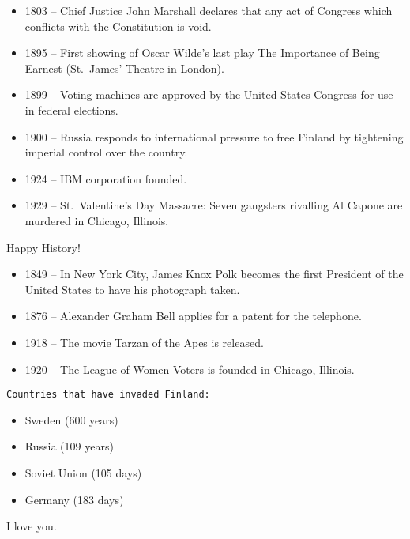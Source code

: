 \documentclass[12pt]{article}
\begin{document}
\vspace{-0.75 cm}
\begin{itemize}\setlength{\itemsep}{-0.12 cm}
\item 1803 -- Chief Justice John Marshall declares that any act of Congress which conflicts with the Constitution is void.
\item 1895 -- First showing of Oscar Wilde's last play The Importance of Being Earnest (St.\ James' Theatre in London).
\item 1899 -- Voting machines are approved by the United States Congress for use in federal elections.
\item 1900 -- Russia responds to international pressure to free Finland by tightening imperial control over the country.
\item 1924 -- IBM corporation founded.
\item 1929 -- St.\ Valentine's Day Massacre: Seven gangsters rivalling Al Capone are murdered in Chicago, Illinois.
\end{itemize}

Happy History!

\vspace{-0.75 cm}
\begin{itemize}\setlength{\itemsep}{-0.12 cm}
\item 1849 -- In New York City, James Knox Polk becomes the first President of the United States to have his photograph taken.
\item 1876 -- Alexander Graham Bell applies for a patent for the telephone.
\item 1918 -- The movie Tarzan of the Apes is released.
\item 1920 -- The League of Women Voters is founded in Chicago, Illinois.
\end{itemize}

{\tt Countries that have invaded Finland:

\vspace{-0.75 cm}
\begin{itemize}\setlength{\itemsep}{-0.12 cm}\renewcommand{\labelitemi}{-}
\item Sweden (600 years)
\item Russia (109 years)
\item Soviet Union (105 days)
\item Germany (183 days)
\end{itemize}

\vspace{-0.75 cm}
I love you.}
\end{document}
